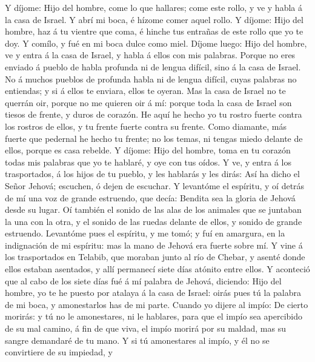  Y díjome: Hijo del hombre, come lo que hallares; come este
rollo, y ve y habla á la casa de Israel.  Y abrí mi boca, é
hízome comer aquel rollo.  Y díjome: Hijo del hombre, haz á
tu vientre que coma, é hinche tus entrañas de este rollo que yo te doy.
Y comílo, y fué en mi boca dulce como miel.  Díjome luego:
Hijo del hombre, ve y entra á la casa de Israel, y habla á ellos con mis
palabras.  Porque no eres enviado á pueblo de habla profunda
ni de lengua difícil, sino á la casa de Israel.  No á muchos
pueblos de profunda habla ni de lengua difícil, cuyas palabras no
entiendas; y si á ellos te enviara, ellos te oyeran.  Mas la
casa de Israel no te querrán oir, porque no me quieren oir á mí: porque
toda la casa de Israel son tiesos de frente, y duros de corazón.
 He aquí he hecho yo tu rostro fuerte contra los rostros de
ellos, y tu frente fuerte contra su frente.  Como diamante,
más fuerte que pedernal he hecho tu frente; no los temas, ni tengas
miedo delante de ellos, porque es casa rebelde.  Y díjome:
Hijo del hombre, toma en tu corazón todas mis palabras que yo te
hablaré, y oye con tus oídos.  Y ve, y entra á los
trasportados, á los hijos de tu pueblo, y les hablarás y les dirás: Así
ha dicho el Señor Jehová; escuchen, ó dejen de escuchar.  Y
levantóme el espíritu, y oí detrás de mí una voz de grande estruendo,
que decía: Bendita sea la gloria de Jehová desde su lugar. 
Oí también el sonido de las alas de los animales que se juntaban la una
con la otra, y el sonido de las ruedas delante de ellos, y sonido de
grande estruendo.  Levantóme pues el espíritu, y me tomó; y
fuí en amargura, en la indignación de mi espíritu: mas la mano de Jehová
era fuerte sobre mí.  Y vine á los trasportados en Telabib,
que moraban junto al río de Chebar, y asenté donde ellos estaban
asentados, y allí permanecí siete días atónito entre ellos.
 Y aconteció que al cabo de los siete días fué á mí palabra
de Jehová, diciendo:  Hijo del hombre, yo te he puesto por
atalaya á la casa de Israel: oirás pues tú la palabra de mi boca, y
amonestarlos has de mi parte.  Cuando yo dijere al impío:
De cierto morirás: y tú no le amonestares, ni le hablares, para que el
impío sea apercibido de su mal camino, á fin de que viva, el impío
morirá por su maldad, mas su sangre demandaré de tu mano. 
Y si tú amonestares al impío, y él no se convirtiere de su impiedad, y
